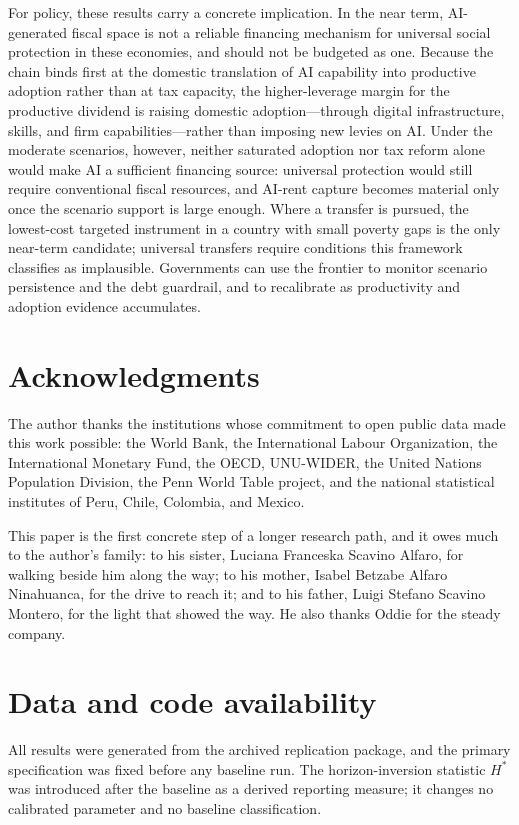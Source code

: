\documentclass[11pt,a4paper]{article}
\begin{document}
For policy, these results carry a concrete implication. In the near term, AI-generated fiscal space is not a reliable financing mechanism for universal social protection in these economies, and should not be budgeted as one. Because the chain binds first at the domestic translation of AI capability into productive adoption rather than at tax capacity, the higher-leverage margin for the productive dividend is raising domestic adoption---through digital infrastructure, skills, and firm capabilities---rather than imposing new levies on AI. Under the moderate scenarios, however, neither saturated adoption nor tax reform alone would make AI a sufficient financing source: universal protection would still require conventional fiscal resources, and AI-rent capture becomes material only once the scenario support is large enough. Where a transfer is pursued, the lowest-cost targeted instrument in a country with small poverty gaps is the only near-term candidate; universal transfers require conditions this framework classifies as implausible. Governments can use the frontier to monitor scenario persistence and the debt guardrail, and to recalibrate as productivity and adoption evidence accumulates.

\section*{Acknowledgments}

The author thanks the institutions whose commitment to open public data made this work possible: the World Bank, the International Labour Organization, the International Monetary Fund, the OECD, UNU-WIDER, the United Nations Population Division, the Penn World Table project, and the national statistical institutes of Peru, Chile, Colombia, and Mexico.

This paper is the first concrete step of a longer research path, and it owes much to the author's family: to his sister, Luciana Franceska Scavino Alfaro, for walking beside him along the way; to his mother, Isabel Betzabe Alfaro Ninahuanca, for the drive to reach it; and to his father, Luigi Stefano Scavino Montero, for the light that showed the way. He also thanks Oddie for the steady company.

\section*{Data and code availability}

All results were generated from the archived replication package, and the primary specification was fixed before any baseline run. The horizon-inversion statistic $H^*$ was introduced after the baseline as a derived reporting measure; it changes no calibrated parameter and no baseline classification.
\end{document}
